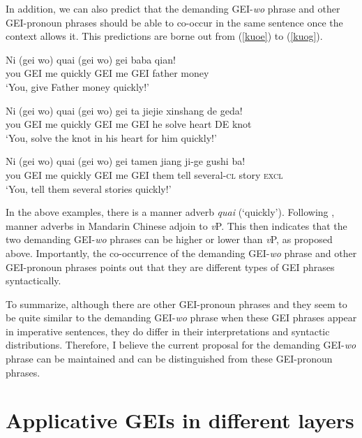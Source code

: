 \documentclass[output=paper,colorlinks,citecolor=brown]{langscibook}
\begin{document}
In addition, we can also predict that the demanding GEI-\textit{wo} phrase and other GEI-pronoun phrases should be able to co-occur in the same sentence once the context allows it. This predictions are borne out from (\ref{kuoe}) to (\ref{kuog}).

\ea
\label{kuoe}
\gll Ni     (gei wo)    quai    (gei wo)    gei baba    qian!\\  
     you     GEI me     quickly  GEI me     GEI father  money\\ 
\glt `You, give Father money quickly!'
\z

\ea
\label{kuof}
\gll Ni     (gei wo)    quai    (gei wo)    gei ta  jiejie  xinshang    de  geda!\\  
     you     GEI me     quickly  GEI me     GEI he  solve   heart       DE  knot\\ 
\glt `You, solve the knot in his heart for him quickly!'
\z

\ea
\label{kuog}
\gll Ni     (gei wo)    quai    (gei wo)    gei tamen   jiang   ji-ge       gushi   ba!\\  
     you     GEI me     quickly  GEI me     GEI them    tell    several-\textsc{cl}  story   \textsc{excl}\\ 
\glt `You, tell them several stories quickly!'
\z

In the above examples, there is a manner adverb \textit{quai} (`quickly'). Following \cite{Tsai2012}, manner adverbs in Mandarin Chinese adjoin to \textit{v}P. This then indicates that the two demanding GEI-\textit{wo} phrases can be higher or lower than \textit{v}P, as proposed above. Importantly, the co-occurrence of the demanding GEI-\textit{wo} phrase and other GEI-pronoun phrases points out that they are different types of GEI phrases syntactically.\par
To summarize, although there are other GEI-pronoun phrases and they seem to be quite similar to the demanding GEI-\textit{wo} phrase when these GEI phrases appear in imperative sentences, they do differ in their interpretations and syntactic distributions. Therefore, I believe the current proposal for the demanding GEI-\textit{wo} phrase can be maintained and can be distinguished from these GEI-pronoun phrases.

\section{Applicative GEIs in different layers}\label{sect5}
\end{document}
